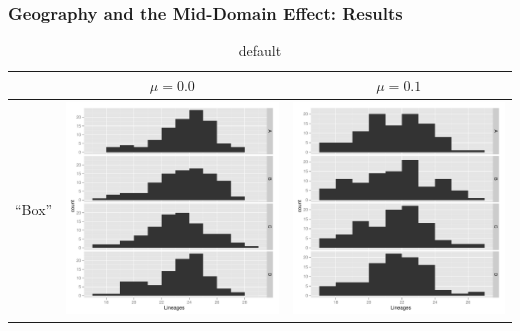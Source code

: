 \documentclass[11pt,t]{beamer}
\begin{document}
\begin{frame}
	\frametitle{Geography and the Mid-Domain Effect: Results}
	

\begin{table}[htdp]
\caption{default}
\begin{center}
\begin{tabular}{l|c|c|}

			& $\mu=0.0$ & $\mu=0.1$ \\
\hline			
``Box''		& \includegraphics[scale=0.15]{results-lineages-box-d0.pdf}		  &  \includegraphics[scale=0.15]{results-lineages-box-d1.pdf}  	\\

\end{tabular}
\end{center}
\end{table}
\end{frame}
\end{document}
